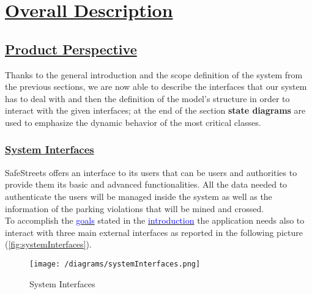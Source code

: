 \section[Overall Description]{\hyperlink{toc}{Overall Description}}

\subsection[Product Perspective]{\hyperlink{toc}{Product Perspective}}
	Thanks to the general introduction and the scope definition of the system from the previous sections, we are now able to describe the interfaces that
	our system has to deal with and then the definition of the model's structure in order to interact with the given interfaces; at the end of the section \textbf{state diagrams} 
	are used to emphasize the dynamic behavior of the most critical classes.
	\subsubsection[System Interfaces]{\hyperlink{toc}{System Interfaces}}
		\label{sec:systemInterfaces}
		SafeStreets offers an interface to its users that can be users and authorities to provide them its basic and advanced functionalities. All the data needed to authenticate
		the users will be managed inside the system as well as the information of the parking violations that will be mined and crossed.\\
		
		To accomplish the \hyperref[sec:goals]{\textcolor{blue}{goals}} stated in the \hyperref[sec:introduction]{\textcolor{blue}{introduction}} the application needs also to interact with three main external interfaces as reported in the following picture (\autoref{fig:systemInterfaces}).  
		\vspace{0,3cm}
		
		\begin{figure}[h]
			\centering
			\texttt{[image: /diagrams/systemInterfaces.png]}
			\caption{\label{fig:systemInterfaces}System Interfaces}
		\end{figure}
		
